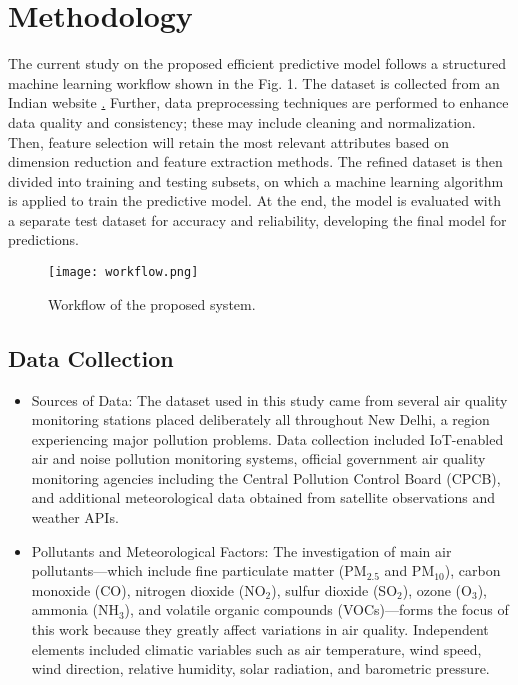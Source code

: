 \documentclass[conference]{IEEEtran}
\begin{document}
\section{Methodology}
The current study on the proposed efficient predictive model follows a structured machine learning workflow shown in the Fig. 1. The dataset is collected from an Indian website
\href{https://www.aqi.in/dashboard/india/delhi/new-delhi}. Further, data preprocessing techniques are performed to enhance data quality and consistency; these may include cleaning and normalization. Then, feature selection will retain the most relevant attributes based on dimension reduction and feature extraction methods. The refined dataset is then divided into training and testing subsets, on which a machine learning algorithm is applied to train the predictive model. At the end, the model is evaluated with a separate test dataset for accuracy and reliability, developing the final model for predictions.

\begin{figure}[htbp]
    \vspace{-12pt}
    \centering
    \texttt{[image: workflow.png]}
    \vspace{-150pt}
    \caption{Workflow of the proposed system.}
    \label{fig:workflow}
    \vspace{-10pt}
\end{figure}

\subsection{Data Collection}
\begin{itemize}
    \item Sources of Data: The dataset used in this study came from several air quality monitoring stations placed deliberately all throughout New Delhi, a region experiencing major pollution problems. Data collection included IoT-enabled air and noise pollution monitoring systems, official government air quality monitoring agencies including the Central Pollution Control Board (CPCB), and additional meteorological data obtained from satellite observations and weather APIs.
    
    \item Pollutants and Meteorological Factors: The investigation of main air pollutants—which include fine particulate matter (PM$_{2.5}$ and PM$_{10}$), carbon monoxide (CO), nitrogen dioxide (NO$_2$), sulfur dioxide (SO$_2$), ozone (O$_3$), ammonia (NH$_3$), and volatile organic compounds (VOCs)—forms the focus of this work because they greatly affect variations in air quality. Independent elements included climatic variables such as air temperature, wind speed, wind direction, relative humidity, solar radiation, and barometric pressure.
\end{itemize}
\end{document}
